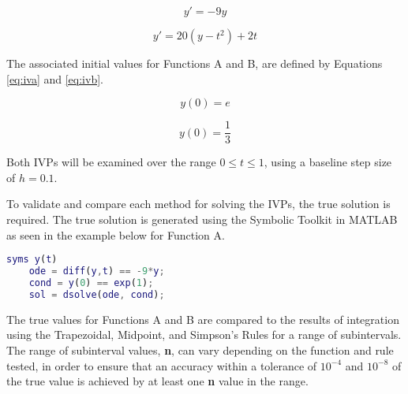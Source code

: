 \documentclass{article}
\begin{document}
\begin{center}
    \centering
    \begin{minipage}{0.5\textwidth}
        \centering
        \begin{equation}
		y' = -9y
		\label{eq:fa}
		\end{equation}
    \end{minipage}\hfill
    \begin{minipage}{0.5\textwidth}
        \centering
        \begin{equation}
        y' = 20 (y-t^2)+2t
		\label{eq:fb}
		\end{equation}
    \end{minipage}
\end{center}


The associated initial values for Functions A and B, are defined by Equations \ref{eq:iva} and \ref{eq:ivb}.


\begin{center}
    \centering
    \begin{minipage}{0.5\textwidth}
        \centering
        \begin{equation}
		y(0) = e
		\label{eq:iva}
		\end{equation}
    \end{minipage}\hfill
    \begin{minipage}{0.5\textwidth}
        \centering
        \begin{equation}
        y(0) = \frac{1}{3}
		\label{eq:ivb}
		\end{equation}
    \end{minipage}
\end{center}


Both IVPs will be examined over the range $ 0 \leq t \leq 1 $, using a baseline step size of $h=0.1$.

To validate and compare each method for solving the IVPs, the true solution is required. The true solution is generated using the Symbolic Toolkit in MATLAB as seen in the example below for Function A.

\bigskip
\begin{lstlisting}[language=Matlab]
	syms y(t)
	ode = diff(y,t) == -9*y;
	cond = y(0) == exp(1);
	sol = dsolve(ode, cond);
\end{lstlisting}
\bigskip


The true values for Functions A and B are compared to the results of integration using the Trapezoidal, Midpoint, and Simpson's Rules for a range of subintervals. The range of subinterval values, \textbf{n}, can vary depending on the function and rule tested, in order to ensure that an accuracy within a tolerance of $10^{-4}$ and $10^{-8}$ of the true value is achieved by at least one \textbf{n} value in the range.
\end{document}
